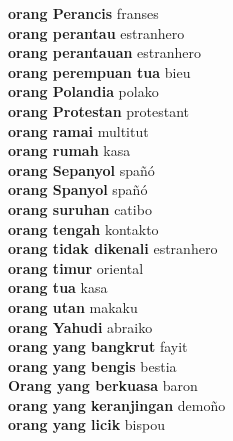 \textbf{ orang Perancis  } franses \\
\textbf{ orang perantau  } estranhero \\
\textbf{ orang perantauan  } estranhero \\
\textbf{ orang perempuan tua  } bieu \\
\textbf{ orang Polandia  } polako \\
\textbf{ orang Protestan  } protestant \\
\textbf{ orang ramai  } multitut \\
\textbf{ orang rumah  } kasa \\
\textbf{ orang Sepanyol  } spañó \\
\textbf{ orang Spanyol  } spañó \\
\textbf{ orang suruhan  } catibo \\
\textbf{ orang tengah  } kontakto \\
\textbf{ orang tidak dikenali  } estranhero \\
\textbf{ orang timur  } oriental \\
\textbf{ orang tua  } kasa \\
\textbf{ orang utan  } makaku \\
\textbf{ orang Yahudi  } abraiko \\
\textbf{ orang yang bangkrut  } fayit \\
\textbf{ orang yang bengis  } bestia \\
\textbf{ Orang yang berkuasa  } baron \\
\textbf{ orang yang keranjingan  } demoño \\
\textbf{ orang yang licik  } bispou \\
